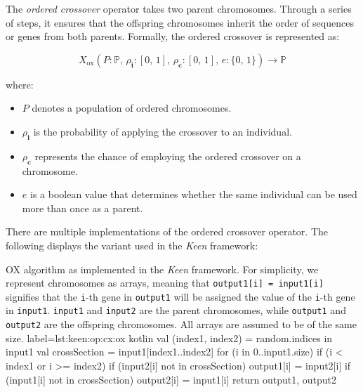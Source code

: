 \begin{definition}
    The \textit{ordered crossover} operator takes two parent chromosomes. Through a series of steps, it ensures that 
    the offspring chromosomes inherit the order of sequences or genes from both parents. Formally, the ordered 
    crossover is represented as:

    \begin{equation}
        X_\mathrm{ox}(P: \mathbb{P},\, \rho_\textbf{i}: [0,\, 1],\, \rho_\mathbf{c}: [0,\, 1],\, e: \{0,\, 1\}) 
            \to \mathbb{P}
    \end{equation}

    where:

    \begin{itemize}
    \item \(P\) denotes a population of ordered chromosomes.
    \item \(\rho_\textbf{i}\) is the probability of applying the crossover to an individual.
    \item \(\rho_\mathbf{c}\) represents the chance of employing the ordered crossover on a chromosome.
    \item \(e\) is a boolean value that determines whether the same individual can be used more than once as a parent.
    \end{itemize}
\end{definition}

There are multiple implementations of the ordered crossover operator. The 
following displays the variant used in the \textit{Keen} framework:

\begin{code}{
    OX algorithm as implemented in the \textit{Keen} framework. For simplicity, we represent chromosomes as arrays, 
    meaning that \texttt{output1[i] = input1[i]} signifies that the \texttt{i}-th gene in \texttt{output1} will be
    assigned the value of the \texttt{i}-th gene in \texttt{input1}. \texttt{input1} and \texttt{input2} are the parent 
    chromosomes, while \texttt{output1} and \texttt{output2} are the offspring chromosomes. All arrays are assumed to
    be of the same size.
}{
    label={lst:keen:op:cx:ox}
}{kotlin}
    val (index1, index2) = random.indices in input1
    val crossSection = input1[index1..index2]
    for (i in 0..input1.size) {
        if (i < index1 or i >= index2) {
            if (input2[i] not in crossSection) {
                output1[i] = input2[i]
            }
            if (input1[i] not in crossSection) {
                output2[i] = input1[i]
            }
        }
    }
    return output1, output2
\end{code}

